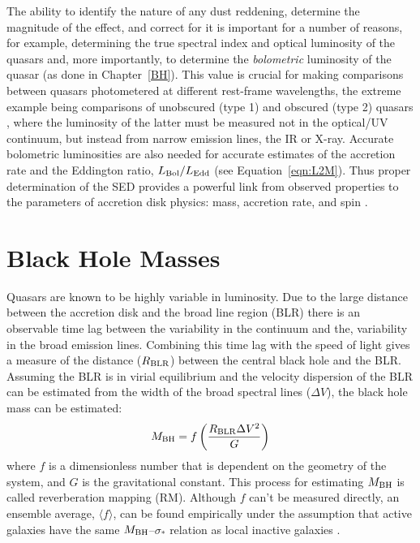 The ability to identify the nature of any dust reddening, determine the magnitude of the effect, and correct for it is important for a number of reasons, for example, determining the true spectral index and optical luminosity of the quasars and, more importantly, to determine the {\em bolometric} luminosity of the quasar (as done in Chapter~\ref{BH}).  This value is crucial for making comparisons between quasars photometered at different rest-frame wavelengths, the extreme example being comparisons of unobscured (type 1) and obscured (type 2) quasars \citep[e.g., ][]{Zakamska:2003,Merloni:2014}, where the luminosity of the latter must be measured not in the optical/UV continuum, but instead from narrow emission lines, the IR or X-ray. Accurate bolometric luminosities are also needed for accurate estimates of the accretion rate and the Eddington ratio, $L_{\rm Bol}/L_{\rm Edd}$ (see Equation~\ref{eqn:L2M}). Thus proper determination of the SED provides a powerful link from observed properties to the parameters of accretion disk physics: mass, accretion rate, and spin \citep{Shakura:1973,Hubeny:1997}.

\section{Black Hole Masses} \label{sec:intro_MBH}

Quasars are known to be highly variable in luminosity.  Due to the large distance between the accretion disk and the broad line region (BLR) there is an observable time lag between the variability in the continuum and the, variability in the broad emission lines.  Combining this time lag with the speed of light gives a measure of the distance ($R_{\rm BLR}$) between the central black hole and the BLR.  Assuming the BLR is in virial equilibrium and the velocity dispersion of the BLR can be estimated from the width of the broad spectral lines ($\Delta V$), the black hole mass can be estimated:
\begin{equation} \label{eqn:mbh_rm}
 \mbh = f\left( \frac{R_{\rm BLR} \Delta V^2}{G} \right)
\end{equation}
where $f$ is a dimensionless number that is dependent on the geometry of the system, and $G$ is the gravitational constant.  This process for estimating $M_{\rm BH}$ is called reverberation mapping (RM).  Although $f$ can't be measured directly, an ensemble average, $\langle f \rangle$, can be found empirically under the assumption that active galaxies have the same $M_{\rm BH}$--$\sigma_*$ relation as local inactive galaxies \citep[e.g.][]{Onken:2004,Woo:2010,Woo:2013,Graham:2011,Park:2012}.

